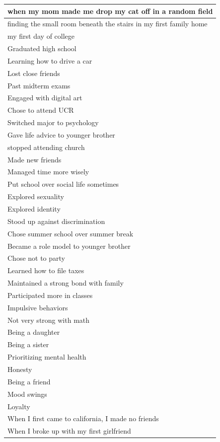 \documentclass[
  .7em,
  letterpaper,
  DIV=11,
  numbers=noendperiod]{scrartcl}
\begin{document}
\begin{table}
\begin{tabular}{l}
\hline
when my mom made me drop my cat off in a random field\\
\hline
finding the small room beneath the stairs in my first family home\\
\hline
my first day of college\\
\hline
Graduated high school\\
\hline
Learning how to drive a car\\
\hline
Lost close friends\\
\hline
Past midterm exams\\
\hline
Engaged with digital art\\
\hline
Chose to attend UCR\\
\hline
Switched major to psychology\\
\hline
Gave life advice to younger brother\\
\hline
stopped attending church\\
\hline
Made new friends\\
\hline
Managed time more wisely\\
\hline
Put school over social life sometimes\\
\hline
Explored sexuality\\
\hline
Explored identity\\
\hline
Stood up against discrimination\\
\hline
Chose summer school over summer break\\
\hline
Became a role model to younger brother\\
\hline
Chose not to party\\
\hline
Learned how to file taxes\\
\hline
Maintained a strong bond with family\\
\hline
Participated more in classes\\
\hline
Impulsive behaviors\\
\hline
Not very strong with math\\
\hline
Being a daughter\\
\hline
Being a sister\\
\hline
Prioritizing mental health\\
\hline
Honesty\\
\hline
Being a friend\\
\hline
Mood swings\\
\hline
Loyalty\\
\hline
When I first came to california, I made no friends\\
\hline
When I broke up with my first girlfriend\\

\end{tabular}
\end{table}
\end{document}
